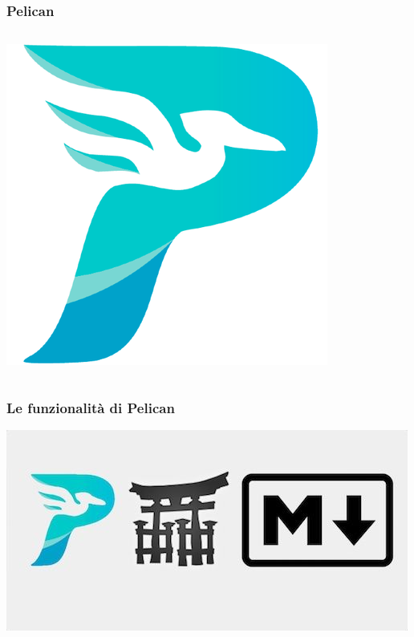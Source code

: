 \begin{frame}
	\frametitle{Pelican}
	\begin{columns}
		\begin{center}
		\includegraphics[scale=0.2]{img/pelican_logo}
		\end{center}
		\begin{center}
		\end{center}
	\end{columns}
\end{frame}

\begin{frame}
	\frametitle{Le funzionalità di Pelican}
	\begin{center}
	\includegraphics[scale=0.5]{img/pelican_stuff}
	\end{center}		
\end{frame}


